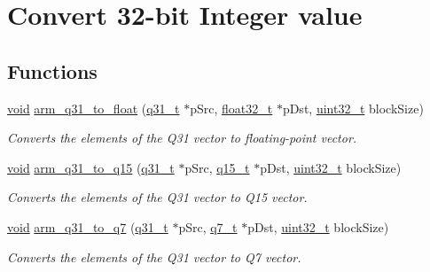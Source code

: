 \hypertarget{group__q31__to__x}{\section{Convert 32-\/bit Integer value}
\label{group__q31__to__x}
}
\subsection*{Functions}
\begin{DoxyCompactItemize}
\item 
\hyperlink{group___n_a_m_e_ga18028b8badbf1ea7e704ccac3c488e82}{void} \hyperlink{group__q31__to__x_gacf407b007a37da18e99dabd9023c56b4}{arm\-\_\-q31\-\_\-to\-\_\-float} (\hyperlink{arm__math_8h_adc89a3547f5324b7b3b95adec3806bc0}{q31\-\_\-t} $\ast$p\-Src, \hyperlink{arm__math_8h_a4611b605e45ab401f02cab15c5e38715}{float32\-\_\-t} $\ast$p\-Dst, \hyperlink{stdint_8h_a435d1572bf3f880d55459d9805097f62}{uint32\-\_\-t} block\-Size)
\begin{DoxyCompactList}\small\item\em Converts the elements of the Q31 vector to floating-\/point vector. \end{DoxyCompactList}\item 
\hyperlink{group___n_a_m_e_ga18028b8badbf1ea7e704ccac3c488e82}{void} \hyperlink{group__q31__to__x_ga901dede4661365c9e7c630d3eb31c32c}{arm\-\_\-q31\-\_\-to\-\_\-q15} (\hyperlink{arm__math_8h_adc89a3547f5324b7b3b95adec3806bc0}{q31\-\_\-t} $\ast$p\-Src, \hyperlink{arm__math_8h_ab5a8fb21a5b3b983d5f54f31614052ea}{q15\-\_\-t} $\ast$p\-Dst, \hyperlink{stdint_8h_a435d1572bf3f880d55459d9805097f62}{uint32\-\_\-t} block\-Size)
\begin{DoxyCompactList}\small\item\em Converts the elements of the Q31 vector to Q15 vector. \end{DoxyCompactList}\item 
\hyperlink{group___n_a_m_e_ga18028b8badbf1ea7e704ccac3c488e82}{void} \hyperlink{group__q31__to__x_ga7f297d1a7d776805395095fdb24a8071}{arm\-\_\-q31\-\_\-to\-\_\-q7} (\hyperlink{arm__math_8h_adc89a3547f5324b7b3b95adec3806bc0}{q31\-\_\-t} $\ast$p\-Src, \hyperlink{arm__math_8h_ae541b6f232c305361e9b416fc9eed263}{q7\-\_\-t} $\ast$p\-Dst, \hyperlink{stdint_8h_a435d1572bf3f880d55459d9805097f62}{uint32\-\_\-t} block\-Size)
\begin{DoxyCompactList}\small\item\em Converts the elements of the Q31 vector to Q7 vector. \end{DoxyCompactList}\end{DoxyCompactItemize}



